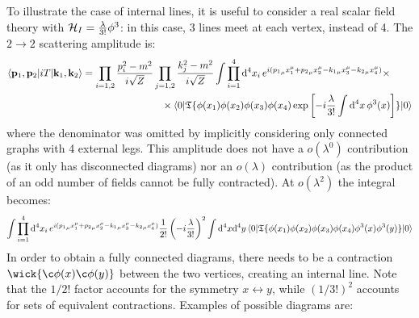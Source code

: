 To illustrate the case of internal lines, it is useful to consider a real scalar field theory with $ \mathcal{H}_I = \frac{\lambda}{3!} \phi^3 $: in this case, 3 lines meet at each vertex, instead of 4. The $ 2 \rightarrow 2 $ scattering amplitude is:
\begin{equation*}
  \begin{split}
    \braket{\mathbf{p}_1 , \mathbf{p}_2 | i T | \mathbf{k}_1 , \mathbf{k}_2}
    & = \prod_{i = 1,2} \frac{p_i^2 - m^2}{i \sqrt{Z}} \prod_{j = 1,2} \frac{k_j^2 - m^2}{i \sqrt{Z}} \int \prod_{i = 1}^4 \mathrm{d}^4x_i\, e^{i ({p_1}_\mu x_1^\mu + {p_2}_\mu x_2^\mu - {k_1}_\mu x_3^\mu - {k_2}_\mu x_4^\mu)} \times \\
    & \qquad \qquad \qquad \qquad \times \braket{0 | \mathfrak{T}\{\phi(x_1) \phi(x_2) \phi(x_3) \phi(x_4) \exp \left[ -i \frac{\lambda}{3!} \int \mathrm{d}^4x\, \phi^3(x) \right]\} | 0}
  \end{split}
\end{equation*}
where the denominator was omitted by implicitly considering only connected graphs with 4 external legs. This amplitude does not have a $ o(\lambda^0) $ contribution (as it only has disconnected diagrams) nor an $ o(\lambda) $ contribution (as the product of an odd number of fields cannot be fully contracted). At $ o(\lambda^2) $ the integral becomes:
\begin{equation*}
    \int \prod_{i = 1}^4 \mathrm{d}^4x_i\, e^{i ({p_1}_\mu x_1^\mu + {p_2}_\mu x_2^\mu - {k_1}_\mu x_3^\mu - {k_2}_\mu x_4^\mu)} \frac{1}{2!} \left( -i \frac{\lambda}{3!} \right)^2 \int \mathrm{d}^4x \mathrm{d}^4y \braket{0 | \mathfrak{T}\{\phi(x_1) \phi(x_2) \phi(x_3) \phi(x_4) \phi^3(x) \phi^3(y)\} | 0}
\end{equation*}
In order to obtain a fully connected diagrams, there needs to be a contraction $ \wick{\c\phi(x) \c\phi(y)} $ between the two vertices, creating an internal line. Note that the $ 1/2! $ factor accounts for the symmetry $ x \leftrightarrow y $, while $ (1/3!)^2 $ accounts for sets of equivalent contractions. Examples of possible diagrams are:
